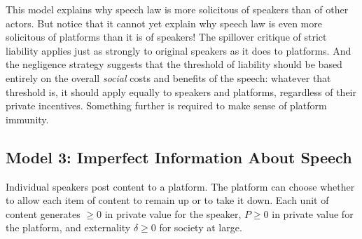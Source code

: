 This model explains why speech law is more solicitous of speakers than of other actors. But notice that it cannot yet explain why speech law is even more solicitous of platforms than it is of speakers! The spillover critique of strict liability applies just as strongly to original speakers as it does to platforms. And the negligence strategy suggests that the threshold of liability should be based entirely on the overall \emph{social} costs and benefits of the speech: whatever that threshold is, it should apply equally to speakers and platforms, regardless of their private incentives. Something further is required to make sense of platform immunity.


\subsection{Model 3: Imperfect Information About Speech}

Individual speakers post content to a platform. The platform can choose whether to allow each item of content to remain up or to take it down. Each unit of content generates $ \ge 0$ in private value for the speaker, $P \ge 0$ in private value for the platform, and externality $\delta \ge 0$ for society at large.

